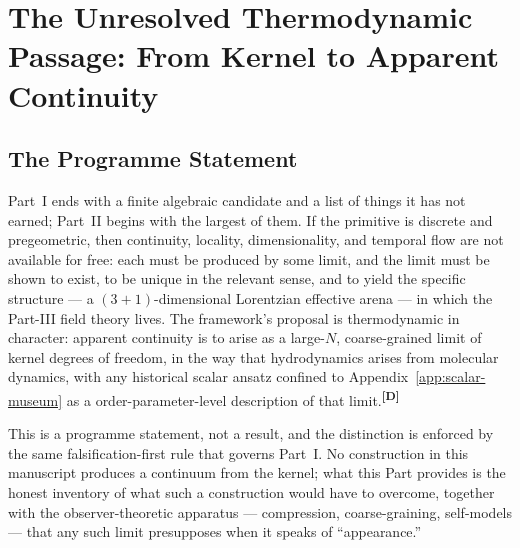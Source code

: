 \documentclass[12pt,a4paper,twoside]{article}
\theoremstyle{plain}
\theoremstyle{definition}
\theoremstyle{remark}
\newcommand{\catmark}[1]{\textsuperscript{\textsf{\textbf{[#1]}}}}
\begin{document}

\section{The Unresolved Thermodynamic Passage: From Kernel to Apparent Continuity}
\label{sec:thermo-passage}

\subsection{The Programme Statement}
\label{subsec:thermo-programme}

Part~I ends with a finite algebraic candidate and a list of things it has
not earned; Part~II begins with the largest of them. If the primitive is
discrete and pregeometric, then continuity, locality, dimensionality, and
temporal flow are not available for free: each must be produced by some
limit, and the limit must be shown to exist, to be unique in the relevant
sense, and to yield the specific structure --- a $(3{+}1)$-dimensional
Lorentzian effective arena --- in which the Part-III field theory lives.
The framework's proposal is thermodynamic in character: apparent
continuity is to arise as a large-$N$, coarse-grained limit of kernel
degrees of freedom, in the way that hydrodynamics arises from molecular
dynamics, with any historical scalar ansatz confined to Appendix~\ref{app:scalar-museum} as a
order-parameter-level description of that limit.\catmark{D}

This is a programme statement, not a result, and the distinction is
enforced by the same falsification-first rule that governs Part~I. No
construction in this manuscript produces a continuum from the kernel; what
this Part provides is the honest inventory of what such a construction
would have to overcome, together with the observer-theoretic apparatus
--- compression, coarse-graining, self-models --- that any such limit
presupposes when it speaks of ``appearance.''
\end{document}

